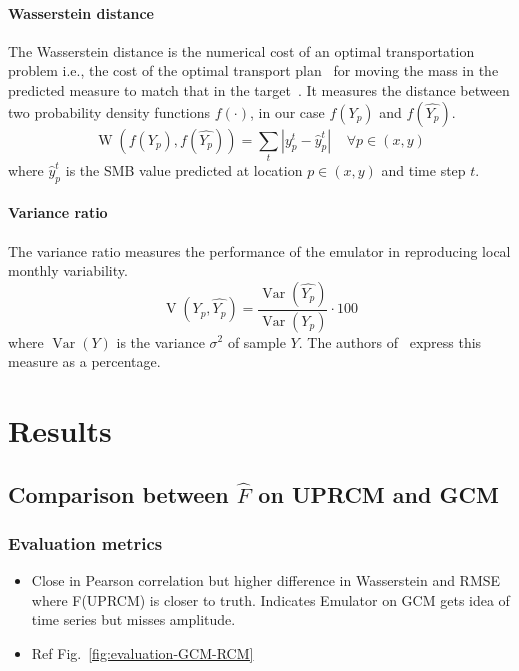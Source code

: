 \documentclass[a4paper,11pt,oneside]{report}
\begin{document}
\subsubsection{Wasserstein distance}\label{subsubsec:wasserstein}
The Wasserstein distance is the numerical cost of an optimal transportation problem i.e., the cost of
the optimal transport plan~\cite{villani} for moving the mass in the predicted
measure to match that in the target~\cite{wasserstein1}. It measures the distance between two probability density functions $f(\cdotp)$, in our case $f(Y_p)$ and $f(\widehat{Y_p})$.
\begin{equation}
    \operatorname{W}\left(f(Y_p),f(\widehat{Y_p})\right) = \sum_{t}|y^{t}_{p}-\hat{y}_{p}^{t}| \;\;\;\; \forall p \in (x,y)
\end{equation}
 where $\hat{y}_{p}^{t}$ is the SMB value predicted at location $p\in (x,y)$ and time step $t$.

\subsubsection{Variance ratio}\label{subsubsec:variance-ratio}
 The variance ratio measures the performance of the emulator in reproducing local monthly variability. 
 \begin{equation}
     \operatorname{V}(Y_{p},\widehat{Y_{p}}) = \frac{\operatorname{Var}(\widehat{Y_{p}})}{\operatorname{Var}(Y_{p})}\cdot100
 \end{equation}
 where $\operatorname{Var}(Y)$ is the variance $\sigma^2$ of sample $Y$. The authors of~\cite{Doury} express this measure as a percentage. 



\chapter{Results}

\section{Comparison between $\hat{F}$ on UPRCM and GCM}

\subsection{Evaluation metrics}

\begin{itemize}
    \item Close in Pearson correlation but higher difference in Wasserstein and RMSE where F(UPRCM) is closer to truth. Indicates Emulator on GCM gets idea of time series but misses amplitude.
    \item Ref Fig.~\ref{fig:evaluation-GCM-RCM}
\end{itemize}
\end{document}
